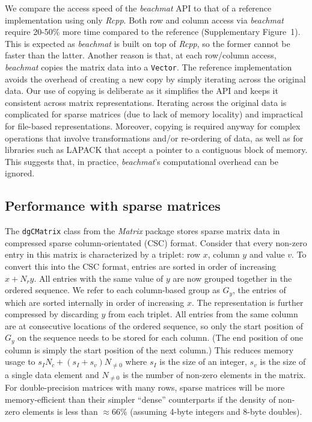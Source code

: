 \documentclass[10pt,letterpaper]{article}
\newcommand{\beachmat}{\textit{beachmat}}
\newcommand{\code}[1]{\texttt{#1}}
\newcommand{\suppfigsimpleaccess}{1}
\begin{document}

We compare the access speed of the \beachmat{} API to that of a reference implementation using only \textit{Rcpp}.
Both row and column access via \beachmat{} require 20-50\% more time compared to the reference (Supplementary Figure~\suppfigsimpleaccess{}).
This is expected as \beachmat{} is built on top of \textit{Rcpp}, so the former cannot be faster than the latter.
Another reason is that, at each row/column access, \beachmat{} copies the matrix data into a \code{Vector}.
The reference implementation avoids the overhead of creating a new copy by simply iterating across the original data.
Our use of copying is deliberate as it simplifies the API and keeps it consistent across matrix representations. 
Iterating across the original data is complicated for sparse matrices (due to lack of memory locality) and impractical for file-based representations.
Moreover, copying is required anyway for complex operations that involve transformations and/or re-ordering of data, as well as for libraries such as LAPACK that accept a pointer to a contiguous block of memory.
This suggests that, in practice, \beachmat{}'s computational overhead can be ignored.

\subsection*{Performance with sparse matrices}
The \code{dgCMatrix} class from the \textit{Matrix} package stores sparse matrix data in compressed sparse column-orientated (CSC) format.
Consider that every non-zero entry in this matrix is characterized by a triplet: row $x$, column $y$ and value $v$.
To convert this into the CSC format, entries are sorted in order of increasing $x + N_ry$.
All entries with the same value of $y$ are now grouped together in the ordered sequence.
We refer to each column-based group as $G_y$, the entries of which are sorted internally in order of increasing $x$.
The representation is further compressed by discarding $y$ from each triplet.
All entries from the same column are at consecutive locations of the ordered sequence, so only the start position of $G_y$ on the sequence needs to be stored for each column.
(The end position of one column is simply the start position of the next column.)
This reduces memory usage to $s_IN_c + (s_I + s_v) N_{\ne 0}$ where $s_I$ is the size of an integer, $s_v$ is the size of a single data element and $N_{\ne 0}$ is the number of non-zero elements in the matrix.
For double-precision matrices with many rows, sparse matrices will be more memory-efficient than their simpler ``dense'' counterparts if the density of non-zero elements is less than $\approx66$\% (assuming 4-byte integers and 8-byte doubles). 
\end{document}
